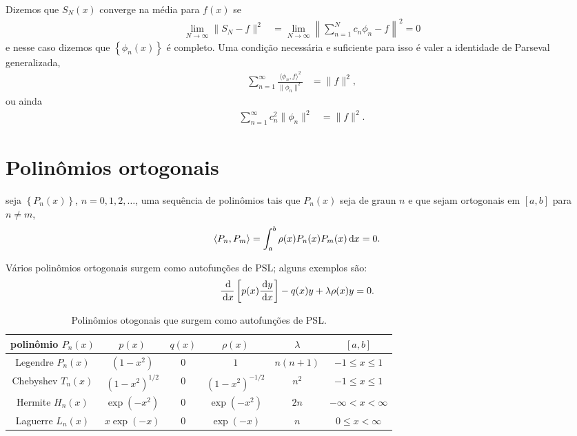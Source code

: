 Dizemos que $S_N(x)$ converge na média para $f(x)$ se
\begin{align*}
    \lim_{N \to \infty} \| S_N - f \|^2 &= \lim_{N \to \infty} \left\| \sum_{n = 1}^N c_n \phi_n - f \right\|^2 = 0
\end{align*}
e nesse caso dizemos que $\left\{ \phi_n(x) \right\}$ é completo. Uma condição necessária e suficiente para isso é valer a identidade de Parseval generalizada,
\begin{align*}
    \sum_{n = 1}^\infty \frac{\langle \phi_n, f \rangle^2}{\| \phi_n \|^2} &= \| f \|^2,
\end{align*}
ou ainda
\begin{align*}
    \sum_{n = 1}^\infty c_n^2 \| \phi_n \|^2 &= \| f \|^2.
\end{align*}

\section{Polinômios ortogonais}
seja $\left\{ P_n(x) \right\}$, $n = 0, 1, 2, \ldots$, uma sequência de polinômios tais que $P_n(x)$ seja de graun $n$ e que sejam ortogonais em $[a,b]$ para $n \neq m$,
\begin{align*}
    \langle P_n, P_m \rangle &= \int_a^b \rho(x) P_n(x) P_m(x) \, \mathrm{d}x = 0.
\end{align*}
\begin{exem}
    Vários polinômios ortogonais surgem como autofunções de PSL; alguns exemplos são:
    \begin{align*}
        \frac{\, \mathrm{d}}{\, \mathrm{d}x}\left[ p(x) \frac{\, \mathrm{d}y}{\, \mathrm{d}x} \right] - q(x) y + \lambda \rho(x) y &= 0.
    \end{align*}
\end{exem}
\begin{table}[!htb]
    \centering
    \caption{Polinômios otogonais que surgem como autofunções de PSL.}
    \label{tab:pol_ort_PSL}
    \begin{tabular}{|c|c|c|c|c|c|}
        \hline
        polinômio $P_n(x)$ & $p(x)$ & $q(x)$ & $\rho(x)$ & $\lambda$ & $[a,b]$ \\ \hline
        Legendre $P_n(x)$ & $\left( 1 - x^2 \right)$ & $0$ & $1$ & $n \left( n + 1 \right)$ & $-1 \leq x \leq 1$ \\ \hline
        Chebyshev $T_n(x)$ & $\left( 1 - x^2 \right)^{1/2}$ & $0$ & $\left( 1 - x^2 \right)^{-1/2}$ & $n^2$ & $-1 \leq x \leq 1$ \\ \hline
        Hermite $H_n(x)$ & $\exp(-x^2)$ & $0$ & $\exp(-x^2)$ & $2n$ & $-\infty < x < \infty$ \\ \hline
        Laguerre $L_n(x)$ & $x \exp(-x)$ & $0$ & $\exp(-x)$ & $n$ & $0 \leq x < \infty$ \\ \hline
    \end{tabular}
\end{table}
